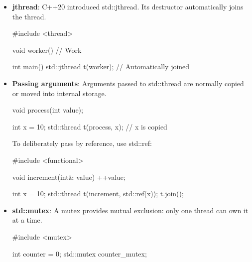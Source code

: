 \documentclass{report}
\begin{document}
\begin{itemize}
\begin{cppcode}
{                    std::thread([&value] {
                        use(value);  // value might already be destroyed
                    }).detach();
                }
            \end{cppcode}
        \item \textbf{jthread}: C++20 introduced std::jthread. Its destructor automatically joins the thread.
            \bigbreak \noindent 
            \begin{cppcode}
                #include <thread>

                void worker() {
                    // Work
                }

                int main() {
                    std::jthread t(worker);
                } // Automatically joined
            \end{cppcode}
        \item \textbf{Passing arguments}: Arguments passed to std::thread are normally copied or moved into internal storage.
            \bigbreak \noindent 
            \begin{cppcode}
                void process(int value);

                int x = 10;
                std::thread t(process, x); // x is copied
            \end{cppcode}
            \bigbreak \noindent 
            To deliberately pass by reference, use std::ref:
            \bigbreak \noindent 
            \begin{cppcode}
                #include <functional>

                void increment(int& value) {
                    ++value;
                }

                int x = 10;
                std::thread t(increment, std::ref(x));
                t.join();
            \end{cppcode}
        \item \textbf{std::mutex}: A mutex provides mutual exclusion: only one thread can own it at a time.
            \bigbreak \noindent 
            \begin{cppcode}
                #include <mutex>

                int counter = 0;
                std::mutex counter_mutex;


\end{cppcode}
\end{itemize}
\end{document}
